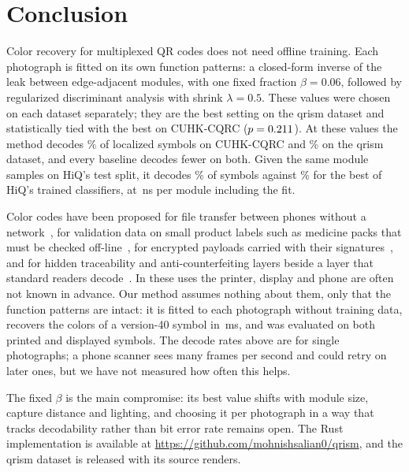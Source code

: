 \section{Conclusion}
\label{sec:conclusion}

Color recovery for multiplexed QR codes does not need offline training. Each photograph is
fitted on its own function patterns: a closed-form inverse of the leak between edge-adjacent
modules, with one fixed fraction $\beta=0.06$, followed by regularized discriminant analysis
with shrink $\lambda=0.5$. These values were chosen on each dataset separately; they are the
best setting on the qrism dataset and statistically tied with the best on CUHK-CQRC
($p=0.211$). At these values the method decodes \HiqCodeChosen\% of localized symbols
on CUHK-CQRC and \QrCodeChosen\% on the qrism dataset, and every baseline decodes fewer on
both. Given the same module samples on HiQ's test split, it decodes \PortOursCode\% of symbols
against \PortCmiCode\% for the best of HiQ's trained classifiers, at \TimeChosenNs\,ns per
module including the fit.

Color codes have been proposed for file transfer between phones without a
network~\cite{toh2016colorqr}, for validation data on small product labels such as medicine
packs that must be checked off-line~\cite{melgar2019hd2dc}, for encrypted payloads carried
with their signatures~\cite{wahsheh2026rgb}, and for hidden traceability and
anti-counterfeiting layers beside a layer that standard readers
decode~\cite{huang2022mc2d,huang2023halftone}. In these uses the printer, display and phone
are often not known in advance. Our method assumes nothing about them, only that the
function patterns are intact: it is fitted to each photograph without training data,
recovers the colors of a version-40 symbol in \TimeChosenVforty\,ms, and was evaluated on
both printed and displayed symbols. The decode rates above are for single photographs; a
phone scanner sees many frames per second and could retry on later ones, but we have not
measured how often this helps.

The fixed $\beta$ is the main compromise: its best value shifts with module size, capture
distance and lighting, and choosing it per photograph in a way that tracks decodability rather than
bit error rate remains open.
The Rust implementation is available at \url{https://github.com/mohnishsalian0/qrism}, and
the qrism dataset is released with its source renders.
